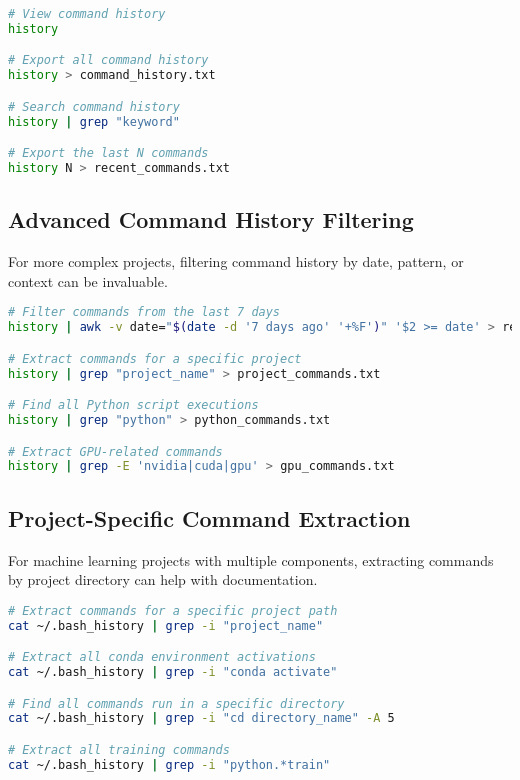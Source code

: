 \documentclass{article}
\begin{document}
\begin{tcolorbox}[colback=brown!5!white, colframe=brown!75!black, title=Basic Command History]
\begin{lstlisting}[language=bash]
# View command history
history

# Export all command history
history > command_history.txt

# Search command history
history | grep "keyword"

# Export the last N commands
history N > recent_commands.txt
\end{lstlisting}
\end{tcolorbox}

\subsection{Advanced Command History Filtering}
For more complex projects, filtering command history by date, pattern, or context can be invaluable.

\begin{tcolorbox}[colback=brown!5!white, colframe=brown!75!black, title=Advanced Command History Filtering]
\begin{lstlisting}[language=bash]
# Filter commands from the last 7 days
history | awk -v date="$(date -d '7 days ago' '+%F')" '$2 >= date' > recent_commands.txt

# Extract commands for a specific project
history | grep "project_name" > project_commands.txt

# Find all Python script executions
history | grep "python" > python_commands.txt

# Extract GPU-related commands
history | grep -E 'nvidia|cuda|gpu' > gpu_commands.txt
\end{lstlisting}
\end{tcolorbox}

\subsection{Project-Specific Command Extraction}
For machine learning projects with multiple components, extracting commands by project directory can help with documentation.

\begin{tcolorbox}[colback=brown!5!white, colframe=brown!75!black, title=Project-Specific Command Extraction]
\begin{lstlisting}[language=bash]
# Extract commands for a specific project path
cat ~/.bash_history | grep -i "project_name"

# Extract all conda environment activations 
cat ~/.bash_history | grep -i "conda activate"

# Find all commands run in a specific directory
cat ~/.bash_history | grep -i "cd directory_name" -A 5

# Extract all training commands
cat ~/.bash_history | grep -i "python.*train"
\end{lstlisting}
\end{tcolorbox}
\end{document}
